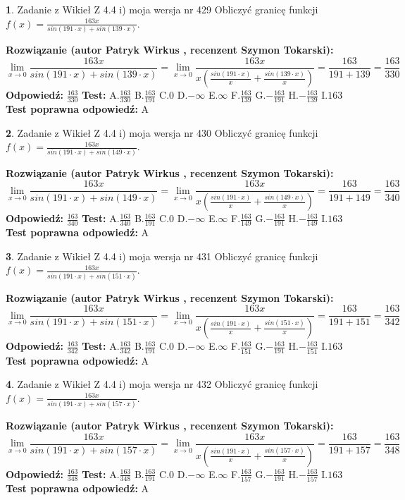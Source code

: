 \documentclass[12pt, a4paper]{article}
\theoremstyle{definition} %
\newtheorem{zad}{}
\newcommand{\zadStart}[1]{\begin{zad}#1\newline}
\newcommand{\zadStop}{\end{zad}}
\newcommand{\rozwStart}[2]{\noindent \textbf{Rozwiązanie (autor #1 , recenzent #2): }\newline}
\newcommand{\rozwStop}{\newline}
\newcommand{\odpStart}{\noindent \textbf{Odpowiedź:}\newline}
\newcommand{\odpStop}{\newline}
\newcommand{\testStart}{\noindent \textbf{Test:}\newline}
\newcommand{\testStop}{\newline}
\newcommand{\kluczStart}{\noindent \textbf{Test poprawna odpowiedź:}\newline}
\newcommand{\kluczStop}{\newline}
\begin{document}
\zadStart{Zadanie z Wikieł Z 4.4 i) moja wersja nr 429}
Obliczyć granicę funkcji $f(x)=\frac{163x}{sin(191\cdot x) +sin(139\cdot x)}$.
\zadStop
\rozwStart{Patryk Wirkus}{Szymon Tokarski}
$$\lim\limits_{x\to 0}\frac{163x}{sin(191\cdot x) +sin(139\cdot x)}=\lim\limits_{x\to 0}\frac{163x}{x(\frac{sin(191\cdot x)}{x}+\frac{sin(139\cdot x)}{x})}=\frac{163}{191+139} = \frac{163}{330}$$
\rozwStop
\odpStart
$\frac{163}{330}$
\odpStop
\testStart
A.$\frac{163}{330}$
B.$\frac{163}{191}$
C.$0$
D.$-\infty$
E.$\infty$
F.$\frac{163}{139}$
G.$-\frac{163}{191}$
H.$-\frac{163}{139}$
I.$163$
\testStop
\kluczStart
A
\kluczStop



\zadStart{Zadanie z Wikieł Z 4.4 i) moja wersja nr 430}
Obliczyć granicę funkcji $f(x)=\frac{163x}{sin(191\cdot x) +sin(149\cdot x)}$.
\zadStop
\rozwStart{Patryk Wirkus}{Szymon Tokarski}
$$\lim\limits_{x\to 0}\frac{163x}{sin(191\cdot x) +sin(149\cdot x)}=\lim\limits_{x\to 0}\frac{163x}{x(\frac{sin(191\cdot x)}{x}+\frac{sin(149\cdot x)}{x})}=\frac{163}{191+149} = \frac{163}{340}$$
\rozwStop
\odpStart
$\frac{163}{340}$
\odpStop
\testStart
A.$\frac{163}{340}$
B.$\frac{163}{191}$
C.$0$
D.$-\infty$
E.$\infty$
F.$\frac{163}{149}$
G.$-\frac{163}{191}$
H.$-\frac{163}{149}$
I.$163$
\testStop
\kluczStart
A
\kluczStop



\zadStart{Zadanie z Wikieł Z 4.4 i) moja wersja nr 431}
Obliczyć granicę funkcji $f(x)=\frac{163x}{sin(191\cdot x) +sin(151\cdot x)}$.
\zadStop
\rozwStart{Patryk Wirkus}{Szymon Tokarski}
$$\lim\limits_{x\to 0}\frac{163x}{sin(191\cdot x) +sin(151\cdot x)}=\lim\limits_{x\to 0}\frac{163x}{x(\frac{sin(191\cdot x)}{x}+\frac{sin(151\cdot x)}{x})}=\frac{163}{191+151} = \frac{163}{342}$$
\rozwStop
\odpStart
$\frac{163}{342}$
\odpStop
\testStart
A.$\frac{163}{342}$
B.$\frac{163}{191}$
C.$0$
D.$-\infty$
E.$\infty$
F.$\frac{163}{151}$
G.$-\frac{163}{191}$
H.$-\frac{163}{151}$
I.$163$
\testStop
\kluczStart
A
\kluczStop



\zadStart{Zadanie z Wikieł Z 4.4 i) moja wersja nr 432}
Obliczyć granicę funkcji $f(x)=\frac{163x}{sin(191\cdot x) +sin(157\cdot x)}$.
\zadStop
\rozwStart{Patryk Wirkus}{Szymon Tokarski}
$$\lim\limits_{x\to 0}\frac{163x}{sin(191\cdot x) +sin(157\cdot x)}=\lim\limits_{x\to 0}\frac{163x}{x(\frac{sin(191\cdot x)}{x}+\frac{sin(157\cdot x)}{x})}=\frac{163}{191+157} = \frac{163}{348}$$
\rozwStop
\odpStart
$\frac{163}{348}$
\odpStop
\testStart
A.$\frac{163}{348}$
B.$\frac{163}{191}$
C.$0$
D.$-\infty$
E.$\infty$
F.$\frac{163}{157}$
G.$-\frac{163}{191}$
H.$-\frac{163}{157}$
I.$163$
\testStop
\kluczStart
A
\kluczStop
\end{document}
